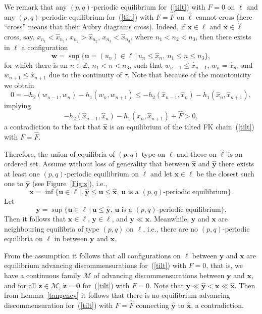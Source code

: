 \documentclass[12pt]{article}
\newcommand{\Z}{\mathbb{Z}}
\newcommand{\emark}{\hfill\hspace{1em}\framebox[0.5em]{\rule{0cm}{0em}}
\vspace{2mm}}
\newcommand{\refer}[1]{~(\ref{#1})}
\newcommand{\wbf}{{\mathbf{w}}}
\newcommand{\ubf}{{\mathbf{u}}}
\newcommand{\zbf}{{\mathbf{z}}}
\newcommand{\xbf}{{\mathbf{x}}}
\newcommand{\ybf}{{\mathbf{y}}}
\newcommand{\zero}{{\mathbf{0}}}
\begin{document}
We remark that any $(p,q)$-periodic equilibrium for\refer{tilt} with $F=0$ on $\ell$ and any $(p,q)$-periodic equilibrium for\refer{tilt} with $F=\hat{F}$ on $\hat{\ell}$ cannot cross (here ``cross'' means that their Aubry diagrams cross). Indeed, if $\xbf\in\ell$ and $\hat{\xbf}\in\hat{\ell}$ cross, say, $x_{n_1}<\hat{x}_{n_1}$, $x_{n_2}>\hat{x}_{n_2}$, $x_{n_3}<\hat{x}_{n_3}$, where $n_1<n_2<n_3$, then there exists in $\ell$ a configuration
$$
\wbf=\sup\{\ubf=(u_n)\in\ell\,|\,u_n\leq\hat{x}_n,\ n_1\leq n\leq n_3\},
$$
for which there is an $n\in\Z$, $n_1<n<n_3$, such that $w_{n-1}\leq \hat{x}_{n-1}$, $w_n=\hat{x}_n$, and $w_{n+1}\leq \hat{x}_{n+1}$ due to the continuity of $\tau$.
Note that because of the monotonicity we obtain
$$
0=-h_2(w_{n-1},w_n)-h_1(w_n,w_{n+1})\leq -h_2(\hat{x}_{n-1},\hat{x}_n)-h_1(\hat{x}_n,\hat{x}_{n+1}),
$$
implying
$$
-h_2(\hat{x}_{n-1},\hat{x}_n)-h_1(\hat{x}_n,\hat{x}_{n+1})+\hat{F}>0,
$$
 a contradiction to the fact that $\hat{\xbf}$ is an equilibrium of the tilted FK chain\refer{tilt} with $F=\hat{F}$.

Therefore, the union of equilibria of $(p,q)$ type on $\ell$ and those on $\hat{\ell}$ is an ordered set. Assume without loss of generality that between $\hat{\xbf}$ and $\hat{\ybf}$ there exists at least one $(p,q)$-periodic equilibrium on $\ell$ and let $\xbf\in\ell$ be the closest such one to $\hat{\ybf}$ (see Figure~\ref{Fig:z}), i.e.,
$$
\xbf=\inf\{\ubf\in\ell\,|,\hat{\ybf}\leq \ubf\leq \hat{\xbf}, \, \ubf\mbox{ is a }(p,q)\mbox{-periodic equilibrium}\}.
$$
Let
$$
\ybf=\sup\{\ubf\in\ell\,|\,\ubf\leq\hat{\ybf}, \,\ubf\mbox{ is a }(p,q)\mbox{-periodic equilibrium}\}.
$$
Then it follows that $\xbf\in\ell$, $\ybf\in\ell$, and $\ybf\ll\xbf$. Meanwhile, $\ybf$ and $\xbf$ are neighbouring equilibria of type $(p,q)$ on $\ell$, i.e., there are no $(p,q)$-periodic equilibria on $\ell$ in between $\ybf$ and $\xbf$.

From the assumption it follows that all configurations on $\ell$ between $\ybf$ and $\xbf$ are equilibrium advancing discommensurations for\refer{tilt} with $F=0$, that is, we have a continuous family $\mathcal{M}$ of advancing discommensurations between $\ybf$ and $\xbf$, and for all $\zbf\in\mathcal{M}$, $\dot{\zbf}=\zero$ for\refer{tilt} with $F=0$. Note that $\ybf\ll\hat{\ybf}<\xbf\ll\hat{\xbf}$. Then from Lemma~\ref{tangency} it follows that there is no equilibrium advancing discommensuration for\refer{tilt} with $F=\hat{F}$ connecting $\hat{\ybf}$ to $\hat{\xbf}$, a contradiction.
\emark
\end{document}

